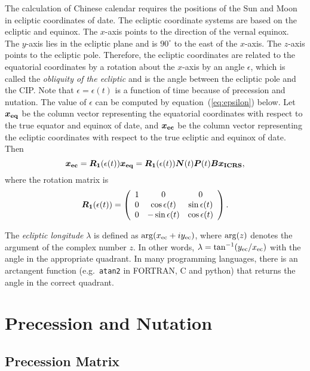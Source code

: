 \documentclass[12pt]{article}
\newcommand \beq {\begin{equation}}
\newcommand \eeq {\end{equation}}
\newcommand{\ve}[1]{\mbox{\boldmath $#1$}}
\begin{document}
\begin{CJK}{UTF8}{bkai}
The calculation of Chinese calendar requires the positions of 
the Sun and Moon in ecliptic coordinates of date. The ecliptic 
coordinate systems are based on the ecliptic and equinox. 
The $x$-axis points to the direction of the vernal equinox. 
The $y$-axis lies in the ecliptic plane and is $90^\circ$ 
to the east of the $x$-axis. The $z$-axis points to the 
ecliptic pole. Therefore, the ecliptic coordinates are 
related to the equatorial coordinates by a rotation about 
the $x$-axis by an angle $\epsilon$, which is called the 
{\it obliquity of the ecliptic} and is the angle between 
the ecliptic pole and the CIP. Note that $\epsilon=\epsilon(t)$ is a function of 
time because of precession and nutation. The value of $\epsilon$ can be 
computed by equation~(\ref{eq:epsilon}) below. Let $\ve{x_{\rm eq}}$ be 
the column vector representing the equatorial coordinates 
with respect to the true equator and equinox of date, and $\ve{x_{\rm ec}}$ 
be the column vector representing the ecliptic coordinates 
with respect to the true ecliptic and equinox of date. Then 
\beq
  \ve{x_{\rm ec}} = \ve{R_1}(\epsilon(t)) \ve{x_{\rm eq}} 
= \ve{R_1}(\epsilon(t)) \ve{N}(t) \ve{P}(t) \ve{B} \ve{x_{\rm ICRS}} ,
\label{eq:ICRS2EC}
\eeq
where the rotation matrix is 
\beq
  \ve{R_1}(\epsilon(t)) = \left( \begin{array}{ccc}
1 & 0 & 0 \\
0 & \cos \epsilon(t) & \sin \epsilon(t) \\
0 & -\sin \epsilon(t) & \cos \epsilon(t) \end{array} \right) .
\label{eq:matrixR1}
\eeq

The {\em ecliptic longitude} $\lambda$ is defined as ${\rm arg}(x_{\rm ec} + i y_{\rm ec})$, 
where ${\rm arg}(z)$ denotes the argument of the complex number $z$. 
In other words, $\lambda = \tan^{-1} (y_{\rm ec}/x_{\rm ec})$ with the 
angle in the appropriate quadrant. In many programming languages, there is 
an arctangent function (e.g.\ {\tt atan2} in FORTRAN, C and python) that returns the angle 
in the correct quadrant.

\section{Precession and Nutation}
\label{sec:precessionNutation}

\subsection{Precession Matrix}


\end{CJK}
\end{document}

